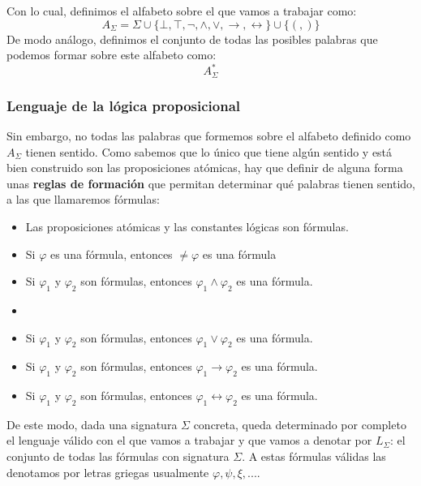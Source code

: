 \documentclass[10pt,a4paper,openright]{book}
\begin{document}
Con lo cual, definimos el alfabeto sobre el que vamos a trabajar como:
$$A_\Sigma = \Sigma\cup \{\bot, \top, \neg, \wedge, \vee, \rightarrow, \leftrightarrow\}\cup \{(,)\}$$
De modo análogo, definimos el conjunto de todas las posibles palabras que podemos formar sobre este alfabeto como:
$$A_\Sigma^*$$

\subsubsection*{Lenguaje de la lógica proposicional}
Sin embargo, no todas las palabras que formemos sobre el alfabeto definido como $A_\Sigma$ tienen sentido. Como sabemos que lo único que tiene algún sentido y está bien construido son las proposiciones atómicas, hay que definir de alguna forma unas \textbf{reglas de formación} que permitan determinar qué palabras tienen sentido, a las que llamaremos fórmulas:
\begin{itemize}
\item Las proposiciones atómicas y las constantes lógicas son fórmulas.
\item Si $\varphi$ es una fórmula, entonces $\neq \varphi$ es una fórmula
\item Si $\varphi_1$ y $\varphi_2$ son fórmulas, entonces $\varphi_1 \wedge \varphi_2$ es una fórmula.
\item \item Si $\varphi_1$ y $\varphi_2$ son fórmulas, entonces $\varphi_1 \vee \varphi_2$ es una fórmula.
\item Si $\varphi_1$ y $\varphi_2$ son fórmulas, entonces $\varphi_1 \rightarrow \varphi_2$ es una fórmula.
\item Si $\varphi_1$ y $\varphi_2$ son fórmulas, entonces $\varphi_1 \leftrightarrow \varphi_2$ es una fórmula.
\end{itemize}
De este modo, dada una signatura $\Sigma$ concreta, queda determinado por completo el lenguaje válido con el que vamos a trabajar y que vamos a denotar por $L_\Sigma$: el conjunto de todas las fórmulas con signatura $\Sigma$. A estas fórmulas válidas las denotamos por letras griegas usualmente $\varphi, \psi, \xi, ...$.
\end{document}
